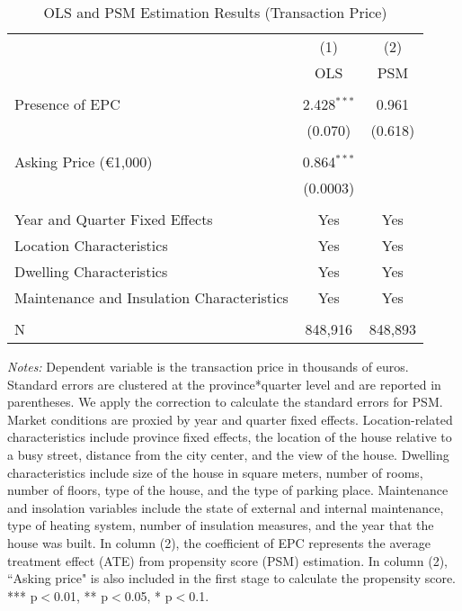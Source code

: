 \documentclass[12pt]{article}
\begin{document}
\clearpage
\newpage
\begin{table}[H]
\footnotesize
  \centering
  \caption{OLS and PSM Estimation Results (Transaction Price)}
      \begin{tabular}{lcc}
\hline
                &\multicolumn{1}{c}{(1)}&\multicolumn{1}{c}{(2)}\\
&                  OLS& PSM \\
\hline
&&\\
 Presence of EPC	 &  2.428$^{***}$ & 0.961 \\
& (0.070) & (0.618)  \\
&&\\
Asking Price (\euro 1,000)	&	 0.864$^{***}$ & 	 \\
&   (0.0003) &  \\
&&\\
Year and Quarter Fixed Effects  & Yes & Yes \\
Location Characteristics & Yes & Yes \\
Dwelling Characteristics  & Yes & Yes \\
Maintenance and Insulation Characteristics & Yes & Yes \\
&&\\
N	& 848,916 &	848,893 \\
\hline

    \end{tabular}%
\begin{tablenotes}
\scriptsize
\item \textit{Notes:} Dependent variable is the transaction price in thousands of euros. Standard errors are clustered at the province*quarter level and are reported in parentheses. We apply the \citep{abadie2016matching} correction to calculate the standard errors for PSM. Market conditions are proxied by year and quarter fixed effects. Location-related characteristics include province fixed effects, the location of the house relative to a busy street, distance from the city center, and the view of the house. Dwelling characteristics include size of the house in square meters, number of rooms, number of floors, type of the house, and the type of parking place. Maintenance and insolation variables include the state of external and internal maintenance, type of heating system, number of insulation measures, and the year that the house was built. In column (2), the coefficient of EPC represents the average treatment effect (ATE) from propensity score (PSM) estimation. In column (2), ``Asking price" is also included in the first stage to calculate the propensity score.   *** p$<$0.01, ** p$<$0.05, * p$<$0.1. 
\end{tablenotes}

  \label{tab:addlabel}%
\end{table}%
\end{document}
